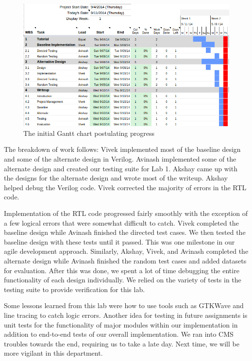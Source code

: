 \documentclass[10pt]{article}
\begin{document}
\begin{figure}
\centering
\includegraphics[scale=0.45]{gantt}
\caption{The initial Gantt chart postulating progress}
\label{fig:gantt}
\end{figure}

The breakdown of work follows:
Vivek implemented most of the baseline design and some of the alternate design in Verilog. 
Avinash implemented some of the alternate design and created our testing suite for Lab 1.
Akshay came up with the designs for the alternate design and wrote most of the writeup.
Akshay helped debug the Verilog code.
Vivek corrected the majority of errors in the RTL code.

Implementation of the RTL code progressed fairly smoothly with the exception of a few logical errors that were somewhat difficult to catch.
Vivek completed the baseline design while Avinash finished the directed test cases. We then tested the baseline design with these tests until it passed. This was one milestone in our agile development approach. Similarly, Akshay, Vivek, and Avinash completed the alternate design while Avinash finished the random test cases and added datasets for evaluation. After this was done, we spent a lot of time debugging the entire functionality of each design individually. We relied on the variety of tests in the testing suite to provide verification for this lab.

Some lessons learned from this lab were how to use tools such as GTKWave and line tracing to catch logic errors. 
Another idea for testing in future assignments is unit tests for the functionality of major modules within our implementation in addition to end-to-end tests of our overall implementation.
We ran into CMS troubles towards the end, requiring us to take a late day.
Next time, we will be more vigilant in this department.
\end{document}
